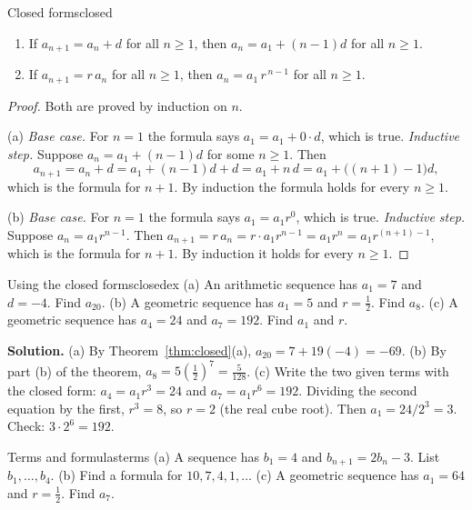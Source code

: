 \documentclass[11pt]{article}
\begin{document}
\begin{thm}{Closed forms}{closed}
\begin{enumerate}[label=(\alph*)]
  \item If $a_{n+1}=a_n+d$ for all $n\ge1$, then $a_n=a_1+(n-1)d$ for all $n\ge1$.
  \item If $a_{n+1}=r\,a_n$ for all $n\ge1$, then $a_n=a_1\,r^{\,n-1}$ for all $n\ge1$.
\end{enumerate}
\end{thm}
\begin{proof}
Both are proved by induction on $n$.

(a) \emph{Base case.} For $n=1$ the formula says $a_1=a_1+0\cdot d$, which is true. \emph{Inductive step.} Suppose $a_n=a_1+(n-1)d$ for some $n\ge1$. Then
\[
a_{n+1}=a_n+d=a_1+(n-1)d+d=a_1+n\,d=a_1+\big((n+1)-1\big)d,
\]
which is the formula for $n+1$. By induction the formula holds for every $n\ge1$.

(b) \emph{Base case.} For $n=1$ the formula says $a_1=a_1r^0$, which is true. \emph{Inductive step.} Suppose $a_n=a_1r^{n-1}$. Then $a_{n+1}=r\,a_n=r\cdot a_1r^{n-1}=a_1r^{n}=a_1r^{(n+1)-1}$, which is the formula for $n+1$. By induction it holds for every $n\ge1$.
\end{proof}

\begin{exmp}{Using the closed forms}{closedex}
(a) An arithmetic sequence has $a_1=7$ and $d=-4$. Find $a_{20}$. (b) A geometric sequence has $a_1=5$ and $r=\frac12$. Find $a_8$. (c) A geometric sequence has $a_4=24$ and $a_7=192$. Find $a_1$ and $r$.

\textbf{Solution.} (a) By Theorem~\ref{thm:closed}(a), $a_{20}=7+19(-4)=-69$. (b) By part (b) of the theorem, $a_8=5\left(\frac12\right)^7=\frac5{128}$. (c) Write the two given terms with the closed form: $a_4=a_1r^3=24$ and $a_7=a_1r^6=192$. Dividing the second equation by the first, $r^3=8$, so $r=2$ (the real cube root). Then $a_1=24/2^3=3$. Check: $3\cdot2^6=192$.
\end{exmp}

\begin{kc}{Terms and formulas}{terms}
(a) A sequence has $b_1=4$ and $b_{n+1}=2b_n-3$. List $b_1,\dots,b_4$. (b) Find a formula for $10,7,4,1,\dots$ (c) A geometric sequence has $a_1=64$ and $r=\frac12$. Find $a_7$.
\end{kc}
\end{document}
